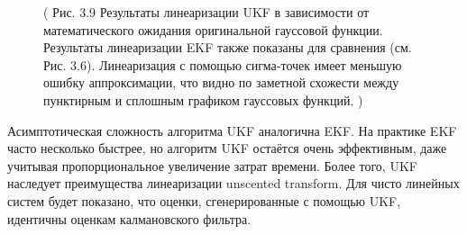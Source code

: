 \documentclass[10pt,a4paper]{article}
\begin{document}
\begin{figure}[H]
	\caption{ (  Рис. 3.9 Результаты линеаризации UKF в зависимости от математического ожидания оригинальной гауссовой функции. Результаты линеаризации EKF также показаны для сравнения (см. Рис. 3.6). Линеаризация с помощью сигма-точек имеет меньшую ошибку аппроксимации, что видно по заметной схожести между пунктирным и сплошным графиком гауссовых функций. )}
	\label{fig:39orig}
\end{figure}

Асимптотическая сложность алгоритма UKF аналогична EKF. На практике EKF часто несколько быстрее, но алгоритм UKF остаётся очень эффективным, даже учитывая пропорциональное увеличение затрат времени. Более того, UKF наследует преимущества линеаризации unscented transform. Для чисто линейных систем будет показано, что оценки, сгенерированные с помощью UKF, идентичны оценкам калмановского фильтра.\\
\end{document}
